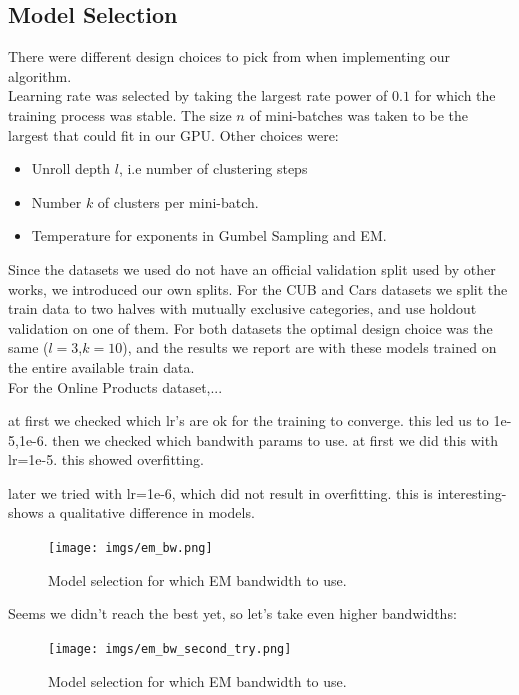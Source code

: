 \subsection{Model Selection}
There were different design choices to pick from when implementing our algorithm.\\
Learning rate was selected by taking the largest rate power of $0.1$ for which the training process was stable.
The size $n$ of mini-batches was taken to be the largest that could fit in our GPU.  
Other choices were:
\begin{itemize}
\item Unroll depth $l$, i.e number of clustering steps 
\item Number $k$ of clusters per mini-batch.
\item Temperature for exponents in Gumbel Sampling and EM. 
\end{itemize}
Since the datasets we used do not have an official validation split used by other works, we introduced our own splits. For the CUB and Cars datasets we split the train data to two halves with mutually exclusive categories, and use holdout validation on one of them. For both datasets the optimal design choice was the same ($l=3$,$k=10$), and the results we report are with these models trained on the entire available train data.\\
For the Online Products dataset,...


at first we checked which lr's are ok for the training to converge. this led us to 1e-5,1e-6.
then we checked which bandwith params to use. at first we did this with lr=1e-5. this showed overfitting.

later we tried with lr=1e-6, which did not result in overfitting. this is interesting- shows a qualitative difference in models.

\begin{figure}
\centering
\texttt{[image: imgs/em\_bw.png]}
\caption{\label{fig:gd_clust_good} Model selection for which EM bandwidth to use.}
\end{figure}
Seems we didn't reach the best yet, so let's take even higher bandwidths:

\begin{figure}
\centering
\texttt{[image: imgs/em\_bw\_second\_try.png]}
\caption{\label{fig:gd_clust_good} Model selection for which EM bandwidth to use.}
\end{figure}

